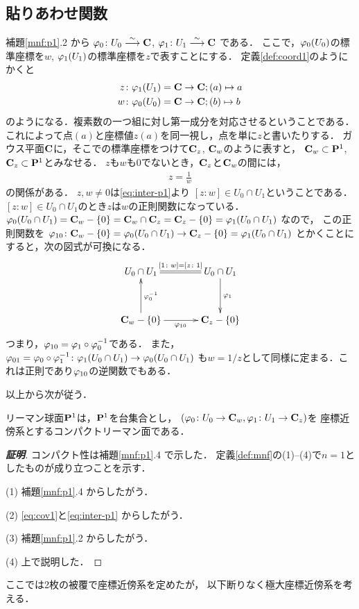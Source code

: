 \subsection{貼りあわせ関数}\label{ssec:patch}

補題\ref{mnf:p1}.2 から
$\varphi_0 \colon U_0\overset{\sim}{\longrightarrow}\mathbf{C}$, $\varphi_1\colon {U_1} \overset{\sim}{\longrightarrow}\mathbf{C}$
である．
ここで，$\varphi_0(U_0)$の標準座標を$w$, 
$\varphi_1(U_1)$の標準座標を$z$で表すことにする．
定義\ref{def:coord1}のようにかくと
\begin{align*}
    z&\colon \varphi_1(U_1)= \mathbf{C} \to \mathbf{C}; (a)\mapsto a\\
    w&\colon \varphi_0(U_0)= \mathbf{C} \to \mathbf{C}; (b)\mapsto b
\end{align*}
のようになる．複素数の一つ組に対し第一成分を対応させるということである．
これによって点$(a)$と座標値$z(a)$を同一視し，点を単に$z$と書いたりする．
ガウス平面$\mathbf{C}$に，そこでの標準座標をつけて$\mathbf{C}_z$, $\mathbf{C}_w$のように表すと，
$\mathbf{C}_w\subset\mathbf{P}^1$, $\mathbf{C}_z\subset\mathbf{P}^1$とみなせる．
$z$も$w$も0でないとき，$\mathbf{C}_z$と$\mathbf{C}_w$の間には，
\begin{align}\label{eq:patch1}
    z=\frac{1}{w}
\end{align}
の関係がある．
$z,w\ne 0$は\eqref{eq:inter-p1}より
$[z\colon w]\in U_0\cap U_1$ということである．
$[z\colon w]\in U_0\cap U_1$のとき$z$は$w$の正則関数になっている．
$\varphi_0 (U_0\cap U_1) = \mathbf{C}_w-\{0\} 
= \mathbf{C}_w \cap \mathbf{C}_z 
= \mathbf{C}_z-\{0\} 
= \varphi_1 (U_0\cap U_1)$
なので，
この正則関数を
$\varphi_{10}\colon \mathbf{C}_w-\{0\}=\varphi_0 (U_0\cap U_1) 
\to \mathbf{C}_z-\{0\} = \varphi_1 (U_0\cap U_1)$
とかくことにすると，次の図式が可換になる．
\begin{equation*}
    \vcenter{\xymatrix@C=35pt@R=35pt{
    {U_0\cap U_1} 
        \ar@{<-{}}[d]^{\pphi_0^{-1}} 
        \ar@{{}=}[r]^-{[1\colon w]=[z\colon 1]}
    & {U_0 \cap U_1} 
        \\
    \cc_w -\{0\}
        \ar[r]_{\pphi_{10}}
    & \cc_z -\{0\}
        \ar@{<-{}}[u]_{\pphi_1}
    }}
\end{equation*}
つまり，$\varphi_{10} = \varphi_1\circ \varphi_0^{-1}$である．
また，$\varphi_{01} = \varphi_0\circ \varphi_1^{-1}\colon \varphi_1 (U_0\cap U_1) \to \varphi_0 (U_0\cap U_1)$
も$w=1/z$として同様に定まる．これは正則であり$\varphi_{10}$の逆関数でもある．

以上から次が従う．

\begin{Proposition}
    リーマン球面$\mathbf{P}^1$は，$\mathbf{P}^1$を台集合とし，
    $(\varphi_0\colon U_0\to\mathbf{C}_w, \varphi_1\colon U_1\to\mathbf{C}_z)$を
    座標近傍系とするコンパクトリーマン面である．    
\end{Proposition}

\begin{proof}[\bf{証明}]
    コンパクト性は補題\ref{mnf:p1}.4 で示した．
    定義\ref{def:mnf}の(1)--(4)で$n=1$としたものが成り立つことを示す．

    (1) 
    補題\ref{mnf:p1}.4 からしたがう．

    (2) 
    \eqref{eq:cov1}と\eqref{eq:inter-p1} からしたがう．

    (3) 
    補題\ref{mnf:p1}.2 からしたがう．

    (4) 
    上で説明した．
\end{proof}
ここでは2枚の被覆で座標近傍系を定めたが，
以下断りなく極大座標近傍系を考える．